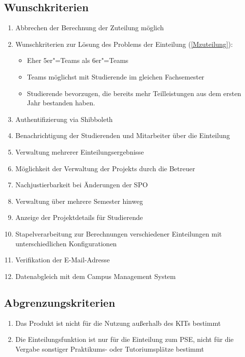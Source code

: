 \documentclass[parskip=full]{scrartcl}
\newcommand{\swtLabel}[1]{\textbf{/#1\arabic*0/}}
\begin{document}
\subsection{Wunschkriterien}
\begin{enumerate}[label=\swtLabel{W}]
  \item Abbrechen der Berechnung der Zuteilung möglich 
    
    \item Wunschkriterien zur Lösung des Problems der Einteilung (\ref{Mzuteilung}):
    \begin{itemize}
        \item Eher 5er"=Teams als 6er"=Teams
        \item Teams möglichst mit Studierende im gleichen Fachsemester 
        \item Studierende bevorzugen, die bereits mehr Teilleistungen aus dem
        ersten Jahr bestanden haben.
    \end{itemize}    
    \item Authentifizierung via Shibboleth
    \item Benachrichtigung der Studierenden und Mitarbeiter über die Einteilung
    \item Verwaltung mehrerer Einteilungsergebnisse
    \item Möglichkeit der Verwaltung der \glspl{Projekt} durch die Betreuer  %
    \item Nachjustierbarkeit bei Änderungen der SPO %
    \item Verwaltung über mehrere Semester hinweg
    \item Anzeige der Projektdetails für Studierende
    \item Stapelverarbeitung zur Berechnungen verschiedener Einteilungen mit
    unterschiedlichen Konfigurationen
    \item Verifikation der E-Mail-Adresse
    \item Datenabgleich mit dem Campus Management System %
    
    
    
\end{enumerate}

\subsection{Abgrenzungskriterien}
\begin{enumerate}[label=\swtLabel{A}]
 
  \item Das Produkt ist nicht für die Nutzung außerhalb des KITs bestimmt %

\item Die Einteilungsfunktion ist nur für die Einteilung zum PSE, nicht
für die Vergabe sonstiger Praktikums- oder Tutoriumsplätze bestimmt
  
\end{enumerate}
\end{document}
